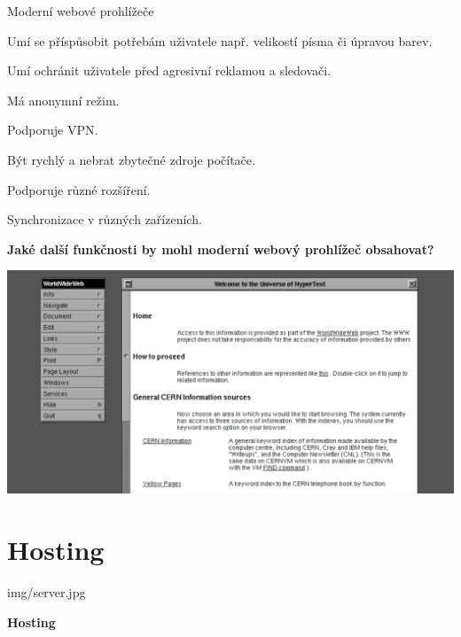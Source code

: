 \documentclass[aspectratio=1610]{beamer}
\begin{document}
\begin{frame}{Moderní webové prohlížeče}
    \begin{cardTiny}
        \begin{flushleft}
            Umí se příspůsobit potřebám uživatele např. velikostí písma či úpravou barev.

            Umí ochránit uživatele před agresivní reklamou a sledovači.

            Má anonymní režim.

            Podporuje VPN.

            Být rychlý a nebrat zbytečné zdroje počítače.

            Podporuje různé rozšíření.

            Synchronizace v různých zařízeních.
        \end{flushleft}
    \end{cardTiny}
    \begin{cardTiny}
        \begin{center}
            \textbf{Jaké další funkčnosti by mohl moderní webový prohlížeč obsahovat?}
        \end{center}
    \end{cardTiny}
\end{frame}

\begin{frame}
    \includegraphics[width=\textwidth]{img/www-1991.png}
\end{frame}




\section{Hosting}

\begin{frameImg}[width]{img/server.jpg}
    \vspace*{60mm}
    \begin{cardTiny}
        \vspace*{\fill}
        \begin{center}
            \textbf{Hosting}
        \end{center}
    \end{cardTiny}
\end{frameImg}
\end{document}

